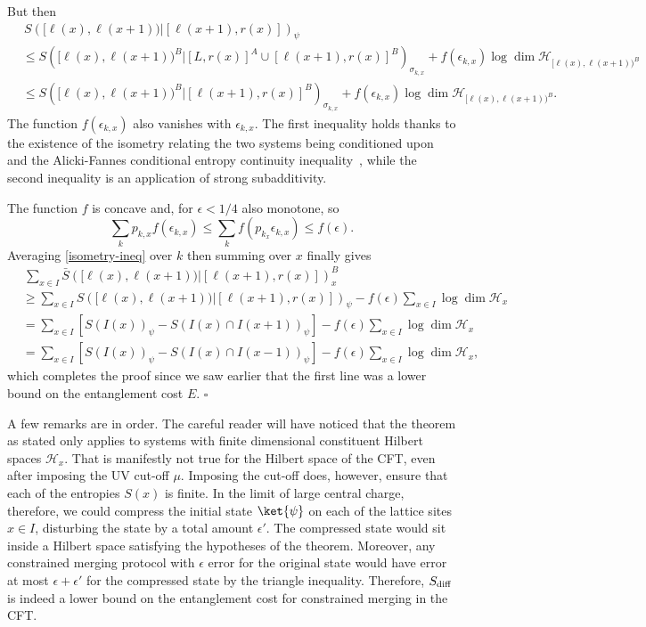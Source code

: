\documentclass[12pt]{article}
\def\sdiff{S_{\rm diff}}
\newcommand{\sbr}{\bar{S}}
\begin{document}
But then
\begin{align}
&\, S \left( [\ell(x), \ell(x+1) ) \big| [\ell(x+1),r(x)] \right)_\psi \nonumber \\
&\leq
S \left( [\ell(x), \ell(x+1) )^B \big| [L,r(x)]^A  \cup [\ell(x+1),r(x)]^B \right)_{\sigma_{k,x}}
	+ f(\epsilon_{k,x}) \log \dim \mathcal{H}_{[\ell(x),\ell(x+1))^B} \nonumber \\
&\leq
S \left( [\ell(x), \ell(x+1) )^B \big| [\ell(x+1),r(x)]^B \right)_{\sigma_{k,x}} + f(\epsilon_{k,x}) \log \dim \mathcal{H}_{[\ell(x),\ell(x+1))^B}. \label{isometry-ineq}
\end{align}
The function $f(\epsilon_{k,x})$ also vanishes with $\epsilon_{k,x}$.
The first inequality holds thanks to the existence of the isometry relating the two systems being conditioned upon and the Alicki-Fannes conditional entropy continuity inequality~\cite{alicki2004continuity}, while the second inequality is an application of strong subadditivity.

The function $f$ is concave and, for $\epsilon < 1/4$ also monotone, so
\begin{equation}
\sum_k p_{k,x} f( \epsilon_{k,x} ) \leq \sum_k f( p_{k_x} \epsilon_{k,x} ) \leq f ( \epsilon ).
\end{equation}
Averaging \eqref{isometry-ineq} over $k$ then summing over $x$ finally gives
\begin{align}
&\, \sum_{x \in I} \sbr\left( [ \ell(x), \ell(x+1) ) \big| [ \ell(x+1), r(x) ] \right)^B_x \nonumber \\
&\geq
\sum_{x \in I} S \left( [\ell(x), \ell(x+1) ) \big| [\ell(x+1),r(x)] \right)_\psi - f(\epsilon) \sum_{x \in I}\log \dim \mathcal{H}_x \nonumber \\
&= \sum_{x \in I} \left[ S( I(x) )_\psi - S( I(x) \cap I(x + 1) )_\psi \right] - f(\epsilon) \sum_{x \in I}\log \dim \mathcal{H}_x  \nonumber \\
&= \sum_{x \in I} \left[ S( I(x) )_\psi - S( I(x) \cap I(x - 1) )_\psi \right] - f(\epsilon) \sum_{x \in I}\log \dim \mathcal{H}_x ,
\end{align}
which completes the proof since we saw earlier that the first line was a lower bound on the entanglement cost $E$. $\square$

A few remarks are in order. The careful reader will have noticed that the theorem as stated only applies to systems with finite dimensional constituent Hilbert spaces $\mathcal{H}_x$. That is manifestly not true for the Hilbert space of the CFT, even after imposing the UV cut-off  $\mu$. Imposing the cut-off does, however, ensure that each of the entropies $S(x)$ is finite. In the limit of large central charge, therefore, we could compress the initial state $\ket{\psi}$ on each of the lattice sites $x \in I$, disturbing the state by a total amount $\epsilon'$. The compressed state would sit inside a Hilbert space satisfying the hypotheses of the theorem. Moreover, any constrained merging protocol with $\epsilon$ error for the original state would have error at most $\epsilon + \epsilon'$ for the compressed state by the triangle inequality. Therefore, $\sdiff$ is indeed a lower bound on the entanglement cost for constrained merging in the CFT.
\end{document}
